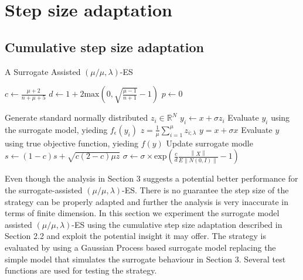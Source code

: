 \section{Step size adaptation}

\subsection{Cumulative step size adaptation}

\begin{algorithm}
\caption{A Surrogate Assisted $(\mu/\mu,\lambda)$-ES}
\label{alg:mml-es}
\begin{algorithmic}[1]
\STATE $c \leftarrow  \frac{\mu +2}{n+\mu+5}$ 
\STATE $d \leftarrow 1 + 2 \text{max}(0, \sqrt{\frac{\mu - 1}{n+1} } - 1 ) $
\STATE $p \leftarrow 0$

		\STATE Generate standard normally distributed $z_i \in \mathbb{R}^N $
		\STATE $y_i \leftarrow x + \sigma z_i$
		\STATE Evaluate $y_i$ using the surrogate model, yieding $f_{\epsilon}(y_i)$
	\ENDFOR
	\STATE $z = \frac{1}{\mu} \sum_{i=1}^{\mu} z_{i;\lambda}$
	\STATE $y = x + \sigma x$
	\STATE Evaluate $y$ using true objective function, yieding $f(y)$
	\STATE Update surrogate modle 
	\STATE $s \leftarrow (1-c)s + \sqrt{ c(2-c) \mu z}$
	\STATE $\sigma \leftarrow \sigma \times \text{exp} \left(\frac{c}{d} \frac{\left\lVert X \right\rVert} { E \left\lVert N(0,I) \right\rVert} -1 \right )$
		

\ENDWHILE

\end{algorithmic}
\end{algorithm}

Even though the analysis in Section 3 suggests a potential better performance for the surrogate-assisted $(\mu/\mu,\lambda)$-ES. There is no guarantee the step size of the strategy can be properly adapted and further the analysis is very inaccurate in terms of finite dimension. In this section we experiment the surrogate model assisted $(\mu/\mu,\lambda)$-ES using the cumulative step size adaptation described in Section 2.2 and exploit the potential insight it may offer. The strategy is evaluated by using a Gaussian Process based surrogate model replacing the simple model that simulates the surrogate behaviour in Section 3. Several test functions are used for testing the strategy.

